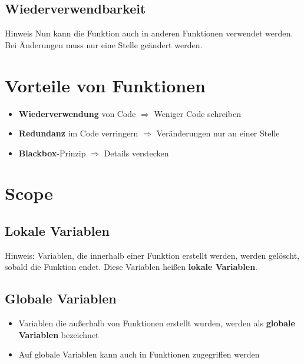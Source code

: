 \subsection{Wiederverwendbarkeit}
\begin{frame}
	\slidehead

	\begin{block}{Hinweis}
		Nun kann die Funktion auch in anderen Funktionen verwendet werden.
		Bei Änderungen muss nur eine Stelle geändert werden.
	\end{block}
\end{frame}

\section{Vorteile von Funktionen}
\begin{frame}
	\slidehead

	\begin{itemize}
		\item \textbf{Wiederverwendung} von Code $\Rightarrow$ Weniger Code schreiben
		\item \textbf{Redundanz} im Code verringern $\Rightarrow$ Veränderungen nur an einer Stelle
		\item \textbf{Blackbox}-Prinzip $\Rightarrow$ Details verstecken
	\end{itemize}
\end{frame}

\livecoding

\section{Scope}
\subsection{Lokale Variablen}
\begin{frame}
	\slidehead
	\pause
	\begin{block}{Hinweis:}
		Variablen, die innerhalb einer Funktion erstellt werden, werden gelöscht, sobald die Funktion endet.
		Diese Variablen heißen \textbf{lokale Variablen}.
	\end{block}
\end{frame}

\subsection{Globale Variablen}
\begin{frame}
	\slidehead
	\begin{itemize}
		\item Variablen die außerhalb von Funktionen erstellt wurden, werden als \textbf{globale Variablen} bezeichnet
		\item Auf globale Variablen kann auch in Funktionen zugegriffen werden
	\end{itemize}
\end{frame}

